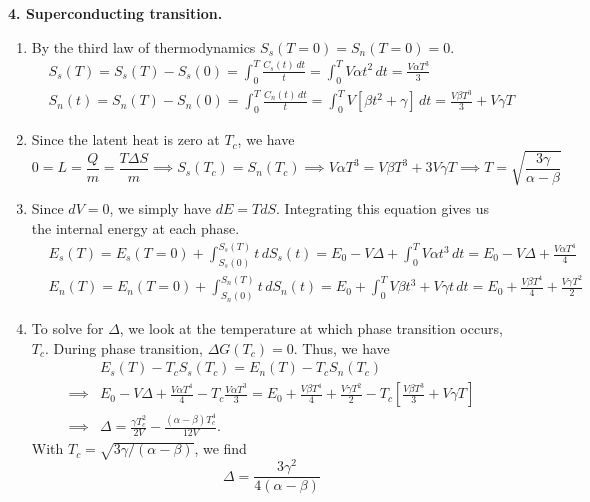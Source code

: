 \documentclass{article}
\theoremstyle{definition}
\newcommand{\al}{\alpha}
\newcommand{\be}{\beta}
\newcommand{\f}[2]{\frac{#1}{#2}}
\newcommand{\lb}{\left[}
\newcommand{\rb}{\right]}
\begin{document}
\noindent \textbf{4. Superconducting transition.} 


\begin{enumerate}[label=(\alph*)]
	\item By the third law of thermodynamics $S_s(T=0) = S_n(T=0) = 0$. 
	\begin{align*}
	&\boxed{S_s(T)} = S_s(T) - S_s(0) = \int^T_0 \f{C_s(t)\,dt}{t} = \int^T_0 V\al t^2\,dt = \boxed{\f{V\al T^3}{3}}\\
	&\boxed{S_n(t)} = S_n(T) - S_n(0) = \int^T_0 \f{C_n(t)\,dt}{t} = \int^T_0 V[\be t^2 + \gamma]\,dt = 
	\boxed{\f{V\be T^3}{3} + V\gamma T}
	\end{align*}
	
	
	\item Since the latent heat is zero at $T_c$, we have
	\begin{equation*}
	0 = L = \f{Q}{m} = \f{T\Delta S}{m} \implies S_s(T_c) = S_n(T_c) \implies V\al T^3 = V\beta T^3 + 3V \gamma T \implies \boxed{T = \sqrt{\f{3\gamma}{\al - \be}}}
	\end{equation*}
	
	
	\item Since $dV=0$, we simply have $dE = TdS$. Integrating this equation gives us the internal energy at each phase. 
	\begin{align*}
	&\boxed{E_s(T)} = E_s(T=0) + \int^{S_s(T)}_{S_s(0)} t \,dS_s(t) = E_0 - V\Delta + \int^T_0 V\al t^3\,dt = \boxed{E_0 - V\Delta + \f{V\al T^4}{4}}\\
	&\boxed{E_n(T)} = E_n(T=0) + \int^{S_n(T)}_{S_n(0)} t \,dS_n(t) = E_0 + \int^T_0 V\be t^3 + V\gamma t\,dt = \boxed{E_0 + \f{V\beta T^4}{4} + \f{V\gamma T^2}{2}}
	\end{align*}
	
	
	
	
	\item To solve for $\Delta$, we look at the temperature at which phase transition occurs, $T_c$. During phase transition, $\Delta G(T_c) = 0$. Thus, we have
	\begin{align*}
	&E_s(T) - T_c S_s(T_c) = E_n(T) - T_c S_n(T_c) \\
	\implies &E_0 - V\Delta + \f{V\al T^4}{4} - T_c\f{V\al T^3}{3} =  E_0 + \f{V\beta T^4}{4} + \f{V\gamma T^2}{2} -T_c \lb \f{V\be T^3}{3} + V\gamma T\rb\\
	\implies &\Delta = \f{\gamma T_c^2}{2V}- \f{(\al-\be)T_c^4}{12V}.
	\end{align*}
	With $T_c = \sqrt{3\gamma/(\al-\be)}$, we find 
	\begin{equation*}
	\boxed{\Delta = \f{3 \gamma^2}{4(\al-\be)}}
	\end{equation*}
	

\end{enumerate}
\end{document}
